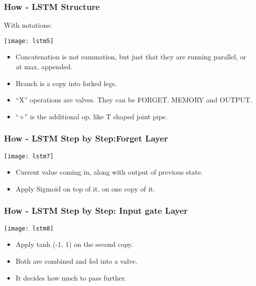 \begin{frame}[fragile] \frametitle{How - LSTM Structure}

With notations:
\begin{center}
\texttt{[image: lstm5]}
\end{center}

\begin{itemize}
\item Concatenation is not summation, but just that they are running parallel, or at max, appended.
\item Branch is a copy into forked legs.
\item ``X'' operations are valves. They can be FORGET. MEMORY and OUTPUT.
\item ``+'' is the additional op, like T shaped joint pipe.
\end{itemize}
\end{frame}


\begin{frame}[fragile] \frametitle{How - LSTM Step by Step:Forget Layer}
\begin{center}
\texttt{[image: lstm7]}
\end{center}

\begin{itemize}
\item Current value coming in, along with output of previous state. 
\item Apply Sigmoid on top of it, on one copy of it.
\end{itemize}
\end{frame}


\begin{frame}[fragile] \frametitle{How - LSTM Step by Step: Input gate Layer}
\begin{center}
\texttt{[image: lstm8]}
\end{center}

\begin{itemize}
\item Apply tanh (-1, 1) on the second copy. 
\item Both are combined and fed into a valve. 
\item It decides how much to pass further.
\end{itemize}
\end{frame}

